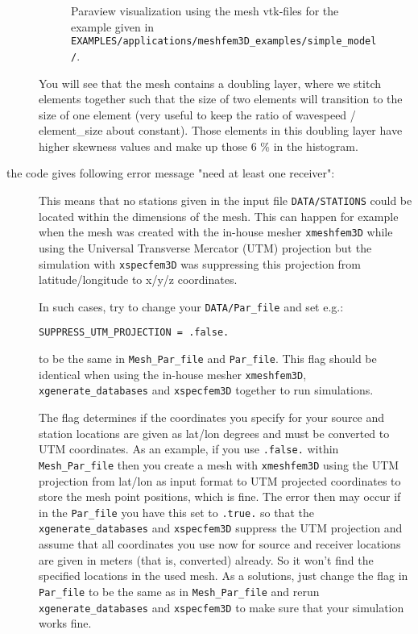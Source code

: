 \begin{description}
\begin{figure}[htbp]
\caption{Paraview visualization using the mesh vtk-files for the example given
in \texttt{EXAMPLES/applications/meshfem3D\_examples/simple\_model/}.}


\label{fig:mesh.vp}
\end{figure}



You will see that the mesh contains a doubling layer, where we stitch
elements together such that the size of two elements will transition
to the size of one element (very useful to keep the ratio of wavespeed
/ element\_size about constant). Those elements in this doubling layer
have higher skewness values and make up those 6 \% in the histogram.\newline

\item [{the code gives following error message "need at least one receiver":}] This
means that no stations given in the input file \texttt{DATA/STATIONS}
could be located within the dimensions of the mesh. This can happen
for example when the mesh was created with the in-house mesher \texttt{xmeshfem3D}
while using the Universal Transverse Mercator (UTM) projection but
the simulation with \texttt{xspecfem3D} was suppressing this projection
from latitude/longitude to x/y/z coordinates.\newline


In such cases, try to change your \texttt{DATA/Par\_file} and set
e.g.:
\begin{verbatim}
SUPPRESS_UTM_PROJECTION = .false.
\end{verbatim}
to be the same in \texttt{Mesh\_Par\_file} and \texttt{Par\_file}.
This flag should be identical when using the in-house mesher \texttt{xmeshfem3D},
\texttt{xgenerate\_databases} and \texttt{xspecfem3D} together to
run simulations.\newline


The flag determines if the coordinates you specify for your source
and station locations are given as lat/lon degrees and must be converted
to UTM coordinates. As an example, if you use \texttt{.false.} within
\texttt{Mesh\_Par\_file} then you create a mesh with \texttt{xmeshfem3D}
using the UTM projection from lat/lon as input format to UTM projected
coordinates to store the mesh point positions, which is fine. The
error then may occur if in the \texttt{Par\_file} you have this set
to \texttt{.true.} so that the \texttt{xgenerate\_databases} and \texttt{xspecfem3D}
suppress the UTM projection and assume that all coordinates you use
now for source and receiver locations are given in meters (that is,
converted) already. So it won't find the specified locations in the
used mesh. As a solutions, just change the flag in \texttt{Par\_file}
to be the same as in \texttt{Mesh\_Par\_file} and rerun \texttt{xgenerate\_databases}
and \texttt{xspecfem3D} to make sure that your simulation works fine.\newline


\end{description}
